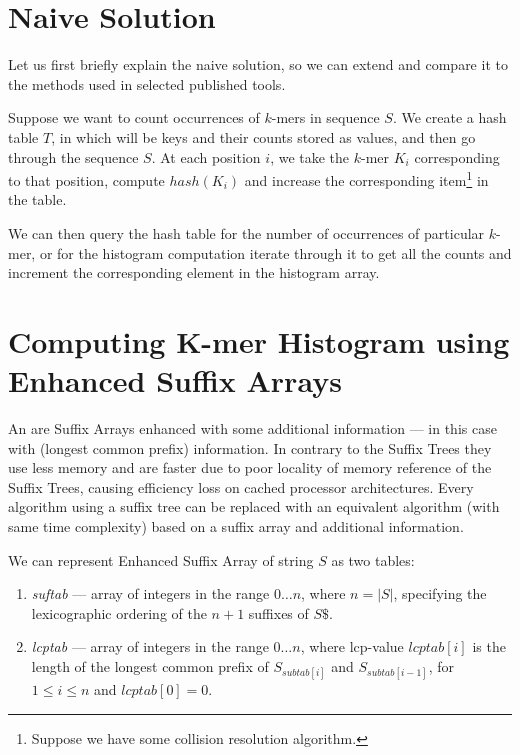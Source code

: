 \section{Naive Solution}

Let us first briefly explain the naive solution, so we can extend and compare it to the methods used in selected published tools.

Suppose we want to count occurrences of $k$-mers in sequence $S$.
We create a hash table $T$, in which \kmers will be keys and their counts stored as values, and then go through the sequence $S$.
At each position $i$, we take the $k$-mer $K_i$ corresponding to that  position, compute $hash(K_i)$ and increase the corresponding item\footnote{Suppose we have some collision resolution algorithm.} in the table.

We can then query the hash table for the number of occurrences of particular $k$-mer, or for the histogram computation iterate through it to get all the counts and increment the corresponding element in the histogram array.

\section{Computing K-mer Histogram using Enhanced Suffix Arrays}

An  are Suffix Arrays enhanced with some additional information --- in this case with  (longest common prefix) information.
In contrary to the Suffix Trees they use less memory and are faster due to poor locality of memory reference of the Suffix Trees, causing efficiency loss on cached processor architectures.
Every algorithm using a suffix tree can be replaced with an equivalent
algorithm (with same time complexity) based on a suffix array and additional information\cite{enhancedsuffixarrays}.

We can represent Enhanced Suffix Array of string $S$ as two tables:
\begin{enumerate}
  \item \emph{suftab} --- array of integers in the range $0\dots n$, where $n = |S|$, specifying the lexicographic ordering of the $n + 1$ suffixes of $S\$ $.
  \item \emph{lcptab} --- array of integers in the range $0\dots n$, where lcp-value $lcptab[i]$ is the length of the longest common prefix of $S_{subtab[i]}$ and $S_{subtab[i-1]}$, for $1 \leq i \leq n$ and $lcptab[0] = 0$.
\end{enumerate}

